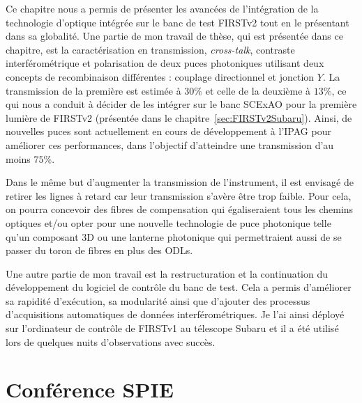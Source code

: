 Ce chapitre nous a permis de présenter les avancées de l'intégration de la technologie d'optique intégrée sur le banc de test \ac{FIRSTv2} tout en le présentant dans sa globalité. Une partie de mon travail de thèse, qui est présentée dans ce chapitre, est la caractérisation en transmission, \textit{cross-talk}, contraste interférométrique et polarisation de deux puces photoniques utilisant deux concepts de recombinaison différentes : couplage directionnel et jonction $Y$. La transmission de la première est estimée à $30\%$ et celle de la deuxième à $13\%$, ce qui nous a conduit à décider de les intégrer sur le banc \ac{SCExAO} pour la première lumière de \ac{FIRSTv2} (présentée dans le chapitre~\ref{sec:FIRSTv2Subaru}). Ainsi, de nouvelles puces sont actuellement en cours de développement à l'\ac{IPAG} pour améliorer ces performances, dans l'objectif d'atteindre une transmission d'au moins $75\%$.

Dans le même but d'augmenter la transmission de l'instrument, il est envisagé de retirer les lignes à retard car leur transmission s'avère être trop faible. Pour cela, on pourra concevoir des fibres de compensation qui égaliseraient tous les chemins optiques et/ou opter pour une nouvelle technologie de puce photonique telle qu'un composant 3D ou une lanterne photonique qui permettraient aussi de se passer du toron de fibres en plus des \ac{ODL}s.

Une autre partie de mon travail est la restructuration et la continuation du développement du logiciel de contrôle du banc de test. Cela a permis d'améliorer sa rapidité d'exécution, sa modularité ainsi que d'ajouter des processus d'acquisitions automatiques de données interférométriques. Je l'ai ainsi déployé sur l'ordinateur de contrôle de \ac{FIRSTv1} au télescope Subaru et il a été utilisé lors de quelques nuits d'observations avec succès.


\clearpage
\section*{Conférence SPIE}
\label{sec:SPIEproceeding}
{}

\clearpage



